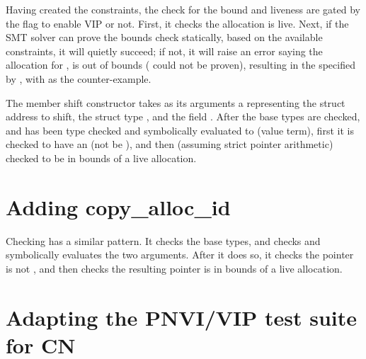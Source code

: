 
Having created the constraints, the check for the bound and liveness are gated
by the flag to enable VIP or not. First, it checks the allocation is live.
Next, if the SMT solver can prove the bounds check statically, based on the
available constraints, it will quietly succeed; if not, it will raise an error
saying the allocation for , is out of bounds
( could not be proven), resulting in the  specified
by , with  as the counter-example.


The member shift constructor takes as its arguments a 
representing the struct address to shift, the struct type ,
and the field . After the base types are checked, and
 has been type checked and symbolically evaluated to
 (value term), first it is checked to have an 
(not be ), and then (assuming strict pointer arithmetic) checked to
be in bounds of a live allocation.


\section{Adding copy\_alloc\_id}

Checking  has a similar pattern. It checks the base
types, and checks and symbolically evaluates the two arguments. After it does so,
it checks the pointer is not , and then checks the resulting
pointer is in bounds of a live allocation.


\section{Adapting the PNVI/VIP test suite for CN}

